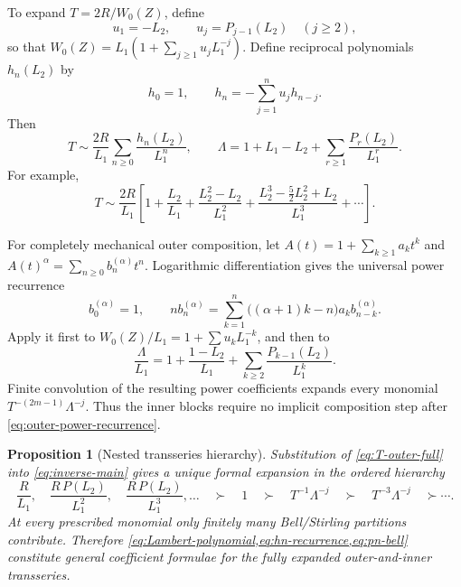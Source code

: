 \documentclass[11pt,oneside]{article}
\theoremstyle{plain}
\newtheorem{proposition}[theorem]{Proposition}
\theoremstyle{definition}
\theoremstyle{remark}
\begin{document}
To expand \(T=2R/W_0(Z)\), define
\begin{equation}
 u_1=-L_2,
 \qquad u_j=P_{j-1}(L_2)\quad(j\ge2),
 \label{eq:uj}
\end{equation}
so that
\(
 W_0(Z)=L_1(1+\sum_{j\ge1}u_jL_1^{-j})
\).
Define reciprocal polynomials \(h_n(L_2)\) by
\begin{equation}
 h_0=1,
 \qquad
 h_n=-\sum_{j=1}^nu_jh_{n-j}.
 \label{eq:hn-recurrence}
\end{equation}
Then
\begin{equation}
 \boxed{
 T\sim\frac{2R}{L_1}\sum_{n\ge0}\frac{h_n(L_2)}{L_1^n},
 \qquad
 \Lambda=1+L_1-L_2+\sum_{r\ge1}\frac{P_r(L_2)}{L_1^r}.}
 \label{eq:T-outer-full}
\end{equation}
For example,
\begin{equation}
 T\sim\frac{2R}{L_1}\left[
 1+\frac{L_2}{L_1}
 +\frac{L_2^2-L_2}{L_1^2}
 +\frac{L_2^3-\tfrac52L_2^2+L_2}{L_1^3}
 +\cdots\right].
 \label{eq:T-first-outer}
\end{equation}

For completely mechanical outer composition, let
\(A(t)=1+\sum_{k\ge1}a_kt^k\) and
\(A(t)^\alpha=\sum_{n\ge0}b_n^{(\alpha)}t^n\).  Logarithmic
differentiation gives the universal power recurrence
\begin{equation}
 b_0^{(\alpha)}=1,
 \qquad
 n b_n^{(\alpha)}
 =\sum_{k=1}^{n}\bigl((\alpha+1)k-n\bigr)
 a_k b_{n-k}^{(\alpha)}.
 \label{eq:outer-power-recurrence}
\end{equation}
Apply it first to
\(W_0(Z)/L_1=1+\sum u_kL_1^{-k}\), and then to
\begin{equation}
 \frac{\Lambda}{L_1}
 =1+\frac{1-L_2}{L_1}
 +\sum_{k\ge2}\frac{P_{k-1}(L_2)}{L_1^k}.
 \label{eq:Lambda-normalized-outer}
\end{equation}
Finite convolution of the resulting power coefficients expands every monomial
\(T^{-(2m-1)}\Lambda^{-j}\).  Thus the inner blocks require no implicit
composition step after \cref{eq:outer-power-recurrence}.

\begin{proposition}[Nested transseries hierarchy]
\label{prop:hierarchy}
Substitution of \cref{eq:T-outer-full} into \cref{eq:inverse-main} gives a
unique formal expansion in the ordered hierarchy
\begin{equation}
 \frac{R}{L_1},\quad
 \frac{R\,P(L_2)}{L_1^2},\quad
 \frac{R\,P(L_2)}{L_1^3},\ldots
 \quad\succ\quad 1
 \quad\succ\quad
 T^{-1}\Lambda^{-j}
 \quad\succ\quad
 T^{-3}\Lambda^{-j}\quad\succ\cdots.
 \label{eq:hierarchy}
\end{equation}
At every prescribed monomial only finitely many Bell/Stirling partitions
contribute.  Therefore \cref{eq:Lambert-polynomial,eq:hn-recurrence,eq:pn-bell} constitute general coefficient formulae for the fully expanded
outer-and-inner transseries.
\end{proposition}
\end{document}
